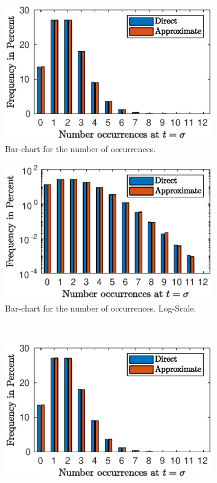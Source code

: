 \documentclass{amsart}
\numberwithin{equation}{section}
\begin{document}
\begin{figure}[ht]
    \centering
    \begin{subfigure}[t]{0.475\textwidth}
        \centering
        \includegraphics[width=\textwidth]{poissproc02_1.eps}
        \caption{Bar-chart for the number of occurrences.}
    \end{subfigure}
    \hfill
    \begin{subfigure}[t]{0.475\textwidth}
        \centering
        \includegraphics[width=\textwidth]{poissproc02_2.eps}
        \caption{Bar-chart for the number of occurrences. Log-Scale.}
    \end{subfigure}
    \\
    \begin{subfigure}[t]{0.475\textwidth}
        \centering
        \includegraphics[width=\textwidth]{poissproc02_changed_1.eps}

\end{subfigure}
\end{figure}
\end{document}
